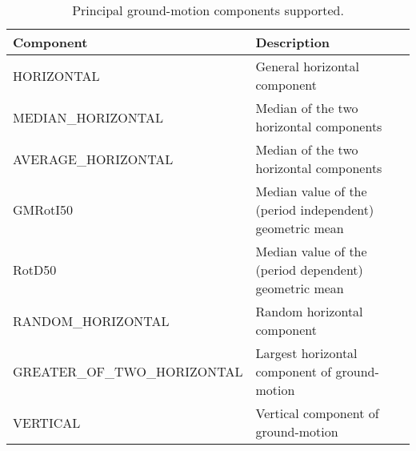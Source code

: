 \begin{table}[!h]
\centering
\begin{tabular}{|p{6cm}p{7cm}|}
\hline
\rowcolor{anti-flashwhite}
\bf{Component} & \bf{Description} \\
\hline 
HORIZONTAL & General horizontal component \\
MEDIAN\_HORIZONTAL & Median of the two horizontal components \\
AVERAGE\_HORIZONTAL & Median of the two horizontal components \\
GMRotI50 & Median value of the (period independent) geometric mean 
           \parencite{boore2006} \\
RotD50 & Median value of the (period dependent) geometric mean 
         \parencite{boore2010} \\
RANDOM\_HORIZONTAL & Random horizontal component \\
GREATER\_OF\_TWO\_HORIZONTAL & Largest horizontal component of ground-motion \\
VERTICAL & Vertical component of ground-motion\\
\hline
\end{tabular}
\caption{Principal ground-motion components supported.}
\label{tab:hor_comp} 
\end{table}
